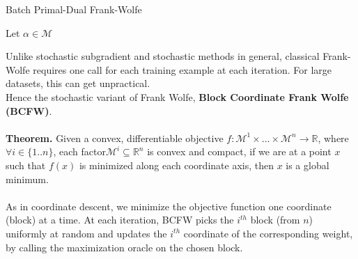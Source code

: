 \documentclass{article}
\begin{document}
\begin{algorithm}[tb]
   \caption{Batch Primal-Dual Frank-Wolfe}
   \label{alg:example}
\begin{algorithmic}
   \STATE Let $\alpha\in\mathcal{M}$
    \\
   \ENDFOR
   \ENDFOR
\end{algorithmic}
\end{algorithm}
Unlike stochastic subgradient and stochastic methods in general, classical Frank-Wolfe requires one call for each training example at each iteration. For large datasets, this can get unpractical.\\
Hence the stochastic variant of Frank Wolfe, \textbf{Block Coordinate Frank Wolfe (BCFW)}.
\\
\\
\textbf{Theorem.} Given a convex, differentiable objective $f:\mathcal{M}^{1}\times...\times\mathcal{M}^{n}\to\mathbb{R}$, where $\forall i\in\{1..n\}$, each factor\quad $\mathcal{M}^{i}\subseteq\mathbb{R}^{n}$ is convex and compact, if we are at a point $x$
such that $f(x)$ is minimized along each coordinate axis, then $x$ is a global minimum.
\\
\\
As in coordinate descent, we minimize the objective function one coordinate (block) at a time. At each iteration, BCFW picks the $i^{th}$ block (from $n$) uniformly at random and updates the $i^{th}$ coordinate of the corresponding weight, by calling the maximization oracle on the chosen block.
\end{document}
